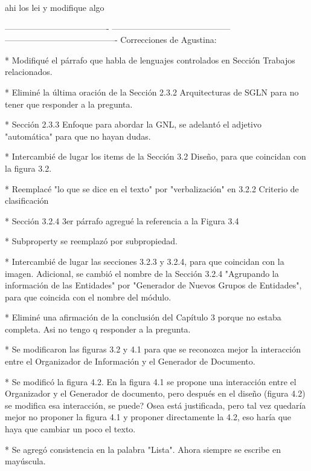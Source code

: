 
ahi los lei y modifique algo


-------------------------------------
------------------------------------------
----------------------------------------
Correcciones de Agustina:

* Modifiqué el párrafo que habla de lenguajes controlados en Sección Trabajos relacionados.

* Eliminé la última oración de la Sección 2.3.2 Arquitecturas de SGLN para no tener que responder a la pregunta.

* Sección 2.3.3 Enfoque para abordar la GNL, se adelantó el adjetivo "automática" para que no hayan dudas.

* Intercambié de lugar los items de la Sección 3.2 Diseño, para que coincidan con la figura 3.2.

* Reemplacé "lo que se dice en el texto" por "verbalización" en 3.2.2 Criterio de clasificación

* Sección 3.2.4 3er párrafo agregué la referencia a la Figura 3.4 

* Subproperty se reemplazó por subpropiedad.

* Intercambié de lugar las secciones 3.2.3 y 3.2.4, para que coincidan con la imagen. Adicional, se cambió el nombre de la Sección 3.2.4 "Agrupando la información de las Entidades" por "Generador de Nuevos Grupos de Entidades", para que coincida con el nombre del módulo.

* Eliminé una afirmación de la conclusión del Capítulo 3 porque no estaba completa. Asi no tengo q responder a la pregunta.

* Se modificaron las figuras 3.2 y 4.1 para que se reconozca mejor la interacción entre el Organizador de Información y el Generador de Documento.

* Se modificó la figura 4.2. En la figura 4.1 se propone una interacción entre el Organizador y el Generador de documento, pero después en el diseño (figura 4.2) se modifica esa interacción, se puede? Osea está justificada, pero tal vez quedaría mejor no proponer la figura 4.1 y proponer directamente la 4.2, eso haría que haya que cambiar un poco el texto.

* Se agregó consistencia en la palabra "Lista". Ahora siempre se escribe en mayúscula.


